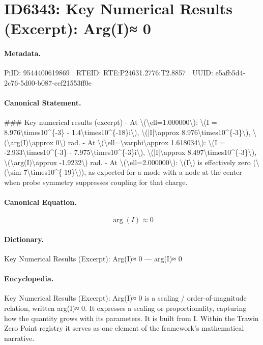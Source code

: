 \section*{ID6343: Key Numerical Results (Excerpt): Arg(I)≈ 0}
\paragraph{Metadata.}
PiID: 9544400619869 | RTEID: RTE:P24631.2776:T2.8857 | UUID: e5afb5d4-2c76-5d00-b087-ccf21553ff0e

\paragraph{Canonical Statement.}
\#\#\# Key numerical results (excerpt) - At \textbackslash{}(\textbackslash{}ell=1.000000\textbackslash{}): \textbackslash{}(I = 8.976\textbackslash{}times10\textasciicircum{}\{-3\} - 1.4\textbackslash{}times10\textasciicircum{}\{-18\}i\textbackslash{}), \textbackslash{}(|I|\textbackslash{}approx 8.976\textbackslash{}times10\textasciicircum{}\{-3\}\textbackslash{}), \textbackslash{}(\textbackslash{}arg(I)\textbackslash{}approx 0\textbackslash{}) rad. - At \textbackslash{}(\textbackslash{}ell=\textbackslash{}varphi\textbackslash{}approx 1.618034\textbackslash{}): \textbackslash{}(I = -2.933\textbackslash{}times10\textasciicircum{}\{-3\} - 7.975\textbackslash{}times10\textasciicircum{}\{-3\}i\textbackslash{}), \textbackslash{}(|I|\textbackslash{}approx 8.497\textbackslash{}times10\textasciicircum{}\{-3\}\textbackslash{}), \textbackslash{}(\textbackslash{}arg(I)\textbackslash{}approx -1.9232\textbackslash{}) rad. - At \textbackslash{}(\textbackslash{}ell=2.000000\textbackslash{}): \textbackslash{}(I\textbackslash{}) is effectively zero (\textbackslash{}(\textbackslash{}sim 7\textbackslash{}times10\textasciicircum{}\{-19\}\textbackslash{})), as expected for a mode with a node at the center when probe symmetry suppresses coupling for that charge.

\paragraph{Canonical Equation.}
\[
\arg(I)\approx 0
\]

\paragraph{Dictionary.}
Key Numerical Results (Excerpt): Arg(I)≈ 0 — arg(I)≈ 0

\paragraph{Encyclopedia.}
Key Numerical Results (Excerpt): Arg(I)≈ 0 is a scaling / order-of-magnitude relation, written arg(I)≈ 0. It expresses a scaling or proportionality, capturing how the quantity grows with its parameters. It is built from I. Within the Trawin Zero Point registry it serves as one element of the framework's mathematical narrative.
